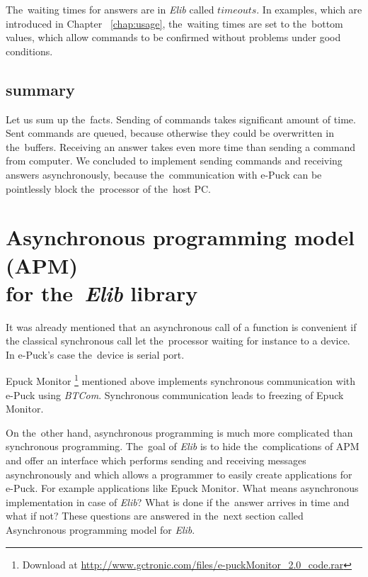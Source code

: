   \begin{definition}[Timeout]
  The~waiting times for answers are in {\it Elib} called $timeouts$.
  In examples, which are introduced in Chapter ~\ref{chap:usage}, the~waiting times are set to the~bottom values,
  which allow commands to be confirmed without problems under good conditions.
  \end{definition}
  
  \subsection*{summary} %
  Let us sum up the~facts. Sending of commands takes significant amount of time.
  Sent commands are queued, because otherwise they could be overwritten in the~buffers.
  Receiving an answer takes even more time than sending a command from computer.
  We concluded to implement sending commands and receiving answers asynchronously, because the~communication with e-Puck
  can be pointlessly block the~processor of the~host PC.

\section{Asynchronous programming model (APM)\\ for the~{\it Elib} library}
  \label{sec:apm}
  It was already mentioned that an asynchronous call of a function is convenient if the
  classical synchronous call let the~processor waiting for instance to a device.
  In e-Puck's case the~device is serial port. 
   
  Epuck Monitor \footnote{\small{Download at \url{http://www.gctronic.com/files/e-puckMonitor_2.0_code.rar}}}
  mentioned above implements synchronous communication with e-Puck using {\it BTCom}.
  Synchronous communication leads to freezing of Epuck Monitor. 

  On the~other hand, asynchronous programming is much more complicated than synchronous programming.
  The~goal of {\it Elib} is to hide the~complications of APM and offer an interface
  which performs sending and receiving messages asynchronously and
  which allows a programmer to easily create applications for e-Puck. For example applications like Epuck Monitor.
  What means asynchronous implementation in case of {\it Elib}? What is done if the~answer arrives in time
  and what if not? These questions are answered in the~next section called Asynchronous programming model for {\it Elib}.

